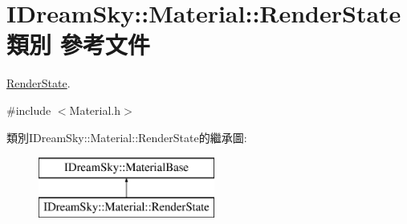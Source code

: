 \hypertarget{class_i_dream_sky_1_1_material_1_1_render_state}{}\section{I\+Dream\+Sky\+:\+:Material\+:\+:Render\+State 類別 參考文件}
\label{class_i_dream_sky_1_1_material_1_1_render_state}


\hyperlink{class_i_dream_sky_1_1_material_1_1_render_state}{Render\+State}.  




{\ttfamily \#include $<$Material.\+h$>$}

類別\+I\+Dream\+Sky\+:\+:Material\+:\+:Render\+State的繼承圖\+:\begin{figure}[H]
\begin{center}
\leavevmode
\includegraphics[height=2.000000cm]{class_i_dream_sky_1_1_material_1_1_render_state}
\end{center}
\end{figure}
